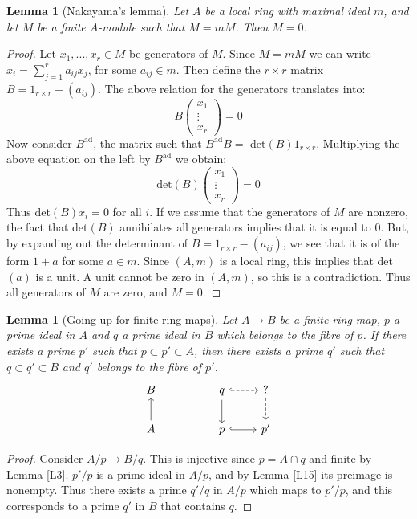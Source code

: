 \documentclass{article}
\theoremstyle{plain}
\newtheorem{lem}[thm]{Lemma}
\theoremstyle{definition}
\theoremstyle{remark}
\begin{document}
\begin{lem} [Nakayama's lemma]
\label{L16}
Let $A$ be a local ring with maximal ideal $m$, and let $M$ be a finite $A$-module such that $M = mM$. Then $M=0$.
\end{lem}
\begin{proof}
Let $x_1, ... , x_r \in M$ be generators of $M$. Since $M = mM$ we can write $x_i = \sum_{j=1}^r a_{ij} x_j$, for some $a_{ij} \in m$. Then define the $r\times r$ matrix $B = 1_{r\times r} - (a_{ij})$. The above relation for the generators translates into:
\[     B \left(  \begin{array} {c} x_1 \\ \vdots \\ x_r  \end{array}  \right)  = 0   \]
Now consider $B^{\text{ad}}$, the matrix such that $B^{\text{ad}} B =$ det$(B) 1_{r\times r}$. Multiplying the above equation on the left by $B^{\text{ad}}$ we obtain:
\[    \text{det}(B) \left(  \begin{array} {c} x_1 \\ \vdots \\ x_r  \end{array}  \right)  = 0   \]
Thus det$(B) x_i = 0$ for all $i$. If we assume that the generators of $M$ are nonzero, the fact that det$(B)$ annihilates all generators implies that it is equal to 0. But, by expanding out the determinant of $B = 1_{r\times r} - (a_{ij})$, we see that it is of the form $1+a$ for some $a\in m$. Since $(A,m)$ is a local ring, this implies that det$(a)$ is a unit. A unit cannot be zero in $(A, m)$, so this is a contradiction. Thus all generators of $M$ are zero, and $M=0$.
\end{proof}

\begin{lem} [Going up for finite ring maps]
\label{L17}
Let $A \to B$ be a finite ring map, $p$ a prime ideal in $A$ and $q$ a prime ideal in $B$ which belongs to the fibre of $p$. If there exists a prime $p'$ such that $p \subset p' \subset A$, then there exists a prime $q'$ such that $q\subset q' \subset B$ and $q'$ belongs to the fibre of $p'$.
\[
\begin{tikzcd}
B & & q\arrow{d}\arrow[dashed, hook]{r} & ?\arrow[dashed]{d} \\
A\arrow{u} &   & p\arrow[hook]{r} & p'
\end{tikzcd}
\]
\end{lem}
\begin{proof}
Consider $A/p \to B/q$. This is injective since $p = A \cap q$ and finite by Lemma \ref{L3}. $p'/p$ is a prime ideal in $A/p$, and by Lemma \ref{L15} its preimage is nonempty. Thus there exists a prime $q'/q$ in $A/p$ which maps to $p'/p$, and this corresponds to a prime $q'$ in $B$ that contains $q$.
\end{proof}
\end{document}
